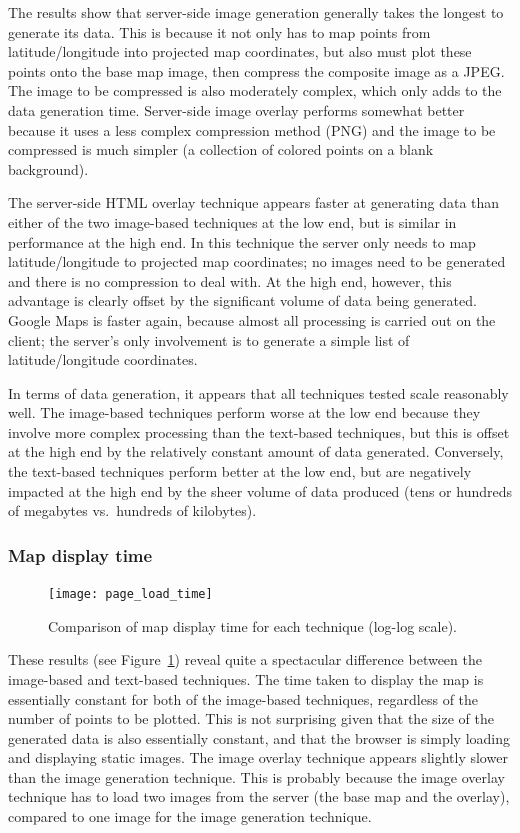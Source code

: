 \documentclass[acmnow]{acmtrans2m}
\begin{document}
The results show that server-side image generation generally takes the
longest to generate its data. This is because it not only has to map
points from latitude/longitude into projected map coordinates, but also
must plot these points onto the base map image, then compress the
composite image as a JPEG. The image to be compressed is also moderately
complex, which only adds to the data generation time. Server-side image
overlay performs somewhat better because it uses a less complex
compression method (PNG) and the image to be compressed is much simpler
(a collection of colored points on a blank background).

The server-side HTML overlay technique appears faster at generating data
than either of the two image-based techniques at the low end, but is
similar in performance at the high end. In this technique the server
only needs to map latitude/longitude to projected map coordinates; no
images need to be generated and there is no compression to deal with. At
the high end, however, this advantage is clearly offset by the
significant volume of data being generated. Google Maps is faster again,
because almost all processing is carried out on the client; the server's
only involvement is to generate a simple list of latitude/longitude
coordinates.

In terms of data generation, it appears that all techniques tested scale
reasonably well. The image-based techniques perform worse at the low end
because they involve more complex processing than the text-based
techniques, but this is offset at the high end by the relatively
constant amount of data generated. Conversely, the text-based techniques
perform better at the low end, but are negatively impacted at the high
end by the sheer volume of data produced (tens or hundreds of megabytes
vs.\ hundreds of kilobytes).


\subsubsection{Map display time}


\begin{figure}
	\centering
	\texttt{[image: page\_load\_time]}
	\caption{Comparison of map display time for each technique (log-log scale).}
	\label{fig-page-load-time}
\end{figure}


These results (see Figure~\ref{fig-page-load-time}) reveal quite a
spectacular difference between the image-based and text-based
techniques. The time taken to display the map is essentially constant
for both of the image-based techniques, regardless of the number of
points to be plotted. This is not surprising given that the size of the
generated data is also essentially constant, and that the browser is
simply loading and displaying static images. The image overlay technique
appears slightly slower than the image generation technique. This is
probably because the image overlay technique has to load two images from
the server (the base map and the overlay), compared to one image for the
image generation technique.
\end{document}
